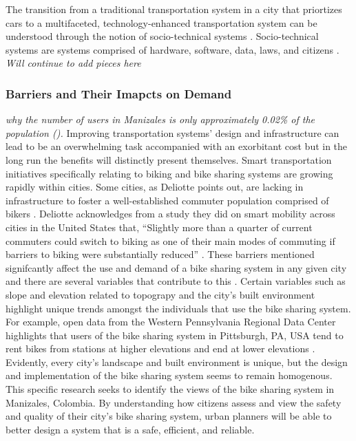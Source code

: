 \documentclass[12pt]{article}
\begin{document}
The transition from a traditional transportation system in a city that priortizes cars to a multifaceted, technology-enhanced transportation system
can be understood through the notion of socio-technical systems \cite{SmartTransportation}. Socio-technical systems are systems comprised of hardware, software,
data, laws, and citizens \cite{GeeksForGeeks}. 
\textit{Will continue to add pieces here}
\subsubsection*{Barriers and Their Imapcts on Demand}
\textit{why the number of users in Manizales is only approximately 0.02\% of the population (\cite{CityBioBike}).}
Improving transportation systems’ design and infrastructure can lead to be an 
overwhelming task accompanied with an exorbitant cost but in the long run the benefits will distinctly present themselves. 
Smart transportation initiatives specifically relating to biking and bike sharing systems are growing rapidly within
cities. Some cities, as Deliotte points out, are lacking in infrastructure to foster a well-established commuter population comprised of 
bikers \cite{DeliotteReport}. Deliotte acknowledges from a study they did on smart mobility across cities in the United States that, “Slightly 
more than a quarter of current commuters could switch to biking as one of their main modes of commuting if barriers 
to biking were substantially reduced” \cite{DeliotteReport}. These barriers mentioned signifcantly affect the use and demand of a bike sharing system in any given city and 
there are several variables that contribute to this \cite{ReviewonBike-sharing}. Certain variables such as slope and elevation related to topograpy and the city's built environment
highlight unique trends amongst the individuals that use the bike sharing system. For example, open data from the Western Pennsylvania Regional Data Center
highlights that users of the bike sharing system in Pittsburgh, PA, USA tend to rent bikes from stations at higher elevations and end at lower elevations \cite{HealthyRidePGHPSG}. Evidently,
every city's landscape and built environment is unique, but the design and implementation of the bike sharing system seems to remain homogenous. This specific research seeks to identify the views
of the bike sharing system in Manizales, Colombia. By understanding how citizens assess and view the 
safety and quality of their city's bike sharing system, urban planners will be able to better design a system that is a safe, efficient, and reliable.
\end{document}
